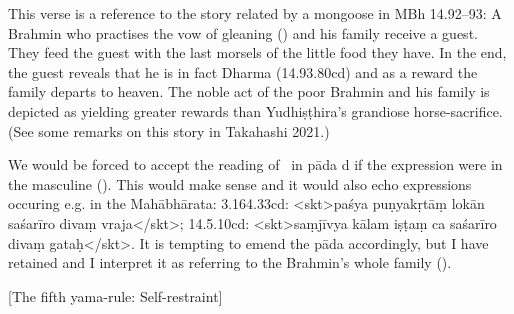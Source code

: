 




{ This verse is a reference to the story related by a mongoose in MBh 14.92--93:                  A Brahmin who practises the vow of gleaning () and his family                 receive a guest. They feed the guest with the last morsels of the little food                 they have. In the end, the guest reveals that he is in fact Dharma (14.93.80cd) and as                  a reward the family departs to heaven. The noble act of the poor Brahmin and his family                 is depicted as yielding greater rewards than Yudhiṣṭhira's grandiose horse-sacrifice.                  (See some remarks on this story in Takahashi 2021.)  

We would be forced to accept the reading of \Ed\ in pāda d if the expression                 were in the masculine (). This would make sense                 and it would also echo expressions occuring e.g. in the Mahābhārata:                 3.164.33cd: <skt>paśya puṇyakṛtāṃ lokān saśarīro divaṃ vraja</skt>;                 14.5.10cd:  <skt>saṃjīvya kālam iṣṭaṃ ca saśarīro divaṃ gataḥ</skt>.                 It is tempting to emend the pāda accordingly, but I have retained                           and I interpret it as                          referring to the Brahmin's whole family ().                  }









\begin{center}
{{[The fifth yama-rule: Self-restraint]}}
\end{center}









